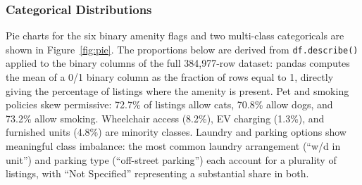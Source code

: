 \subsubsection{Categorical Distributions}
\noindent
Pie charts for the six binary amenity flags and two multi-class categoricals are shown in Figure~\ref{fig:pie}. The proportions below are derived from \texttt{df.describe()} applied to the binary columns of the full 384,977-row dataset: pandas computes the mean of a 0/1 binary column as the fraction of rows equal to 1, directly giving the percentage of listings where the amenity is present. Pet and smoking policies skew permissive: 72.7\% of listings allow cats, 70.8\% allow dogs, and 73.2\% allow smoking. Wheelchair access (8.2\%), EV charging (1.3\%), and furnished units (4.8\%) are minority classes. Laundry and parking options show meaningful class imbalance: the most common laundry arrangement (``w/d in unit'') and parking type (``off-street parking'') each account for a plurality of listings, with ``Not Specified'' representing a substantial share in both.


